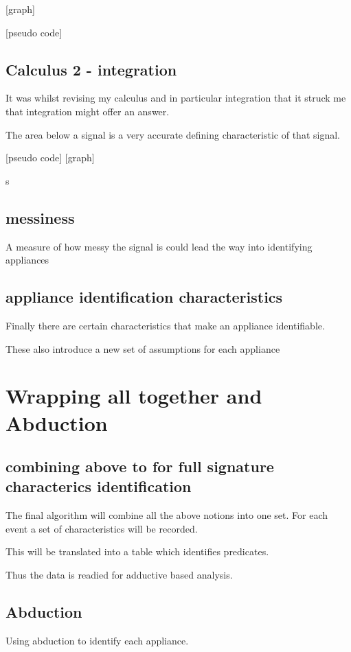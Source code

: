 [graph]

[pseudo code]

\subsection{Calculus 2 - integration}

It was whilst revising my calculus and in particular integration that it struck me that integration might offer an answer.

The area below a signal is a very accurate defining characteristic of that signal.

[pseudo code]
[graph]

s

\subsection{messiness}

A measure of how messy the signal is could lead the way into identifying appliances

\subsection{appliance identification characteristics}

Finally there are certain characteristics that make an appliance identifiable.

These also introduce a new set of assumptions for each appliance


\section{Wrapping all together and Abduction}


\subsection{combining above to for full signature characterics identification}
The final algorithm will combine all the above notions into one set. For each event a set of characteristics will be recorded.

This will be translated into a table which identifies predicates.

Thus the data is readied for adductive based analysis.

\subsection{Abduction}

Using abduction to identify each appliance.

